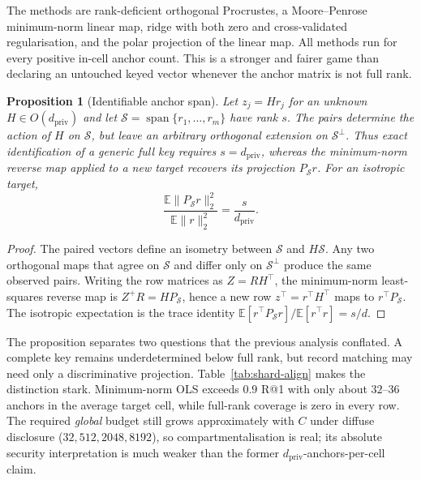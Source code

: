 \documentclass[11pt,a4paper]{article}
\newtheorem{proposition}{Proposition}
\begin{document}
The methods are rank-deficient orthogonal Procrustes, a Moore--Penrose
minimum-norm linear map, ridge with both zero and cross-validated
regularisation, and the polar projection of the linear map. All methods run
for every positive in-cell anchor count. This is a stronger and fairer game
than declaring an untouched keyed vector whenever the anchor matrix is not
full rank.

\begin{proposition}[Identifiable anchor span]\label{prop:anchor}
Let $z_j=H r_j$ for an unknown $H\in O(d_{\mathrm{priv}})$ and let
$\mathcal S=\operatorname{span}\{r_1,\ldots,r_m\}$ have rank $s$. The pairs
determine the action of $H$ on $\mathcal S$, but leave an arbitrary
orthogonal extension on $\mathcal S^\perp$. Thus exact identification of a
generic full key requires $s=d_{\mathrm{priv}}$, whereas the minimum-norm
reverse map applied to a new target recovers its projection
$P_{\mathcal S}r$. For an isotropic target,
\[
 \frac{\mathbb E\lVert P_{\mathcal S}r\rVert_2^2}
      {\mathbb E\lVert r\rVert_2^2}=\frac{s}{d_{\mathrm{priv}}}.
\]
\end{proposition}
\begin{proof}
The paired vectors define an isometry between $\mathcal S$ and
$H\mathcal S$. Any two orthogonal maps that agree on $\mathcal S$ and differ
only on $\mathcal S^\perp$ produce the same observed pairs. Writing the row
matrices as $Z=R H^\top$, the minimum-norm least-squares reverse map is
$Z^+R=H P_{\mathcal S}$, hence a new row $z^\top=r^\top H^\top$ maps to
$r^\top P_{\mathcal S}$. The isotropic expectation is the trace identity
$\mathbb E[r^\top P_{\mathcal S}r]/\mathbb E[r^\top r]=s/d$.
\end{proof}

The proposition separates two questions that the previous analysis
conflated. A complete key remains underdetermined below full rank, but record
matching may need only a discriminative projection.
Table~\ref{tab:shard-align} makes the distinction stark. Minimum-norm OLS
exceeds $0.9$ R@1 with only about $32$--$36$ anchors in the average target
cell, while full-rank coverage is zero in every row. The required
\emph{global} budget still grows approximately with $C$ under diffuse
disclosure ($32,512,2048,8192$), so compartmentalisation is real; its
absolute security interpretation is much weaker than the former
$d_{\mathrm{priv}}$-anchors-per-cell claim.
\end{document}

